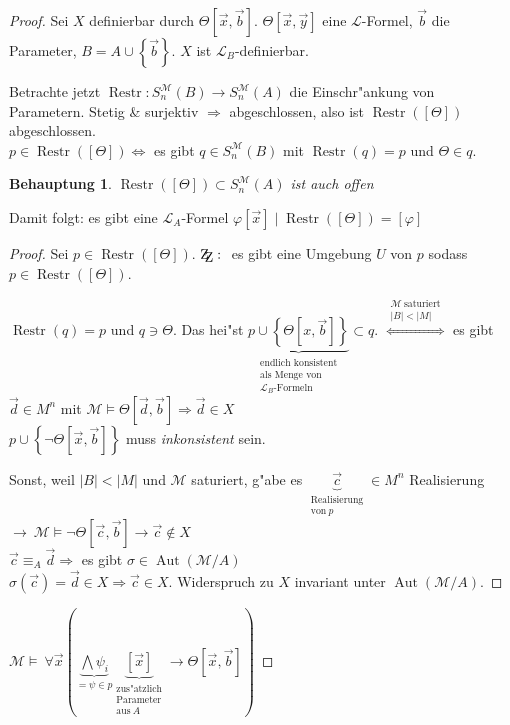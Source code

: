 \documentclass[a4paper,12pt,numbers=noenddot,parskip=full]{scrartcl}
\newcommand{\Forall}{~\forall}
\newcommand{\scrL}{\mathcal{L}}
\newcommand{\scrM}{\mathcal{M}}
\newcommand{\zz}{\mathrm{Z\kern-.3em\raise-0.5ex\hbox{Z}}:~}
\DeclareMathOperator{\au}{Aut}
\DeclareMathOperator{\rest}{Restr}
\theoremstyle{dotless}
\newtheorem*{claim}{Behauptung}
\begin{document}
\begin{proof}
	Sei $X$ definierbar durch $\Theta\left[\vec{x},\vec{b}\right]$. $\Theta\left[\vec{x},\vec{y}\right]$ eine $\scrL$-Formel, $\vec{b}$ die Parameter, $B=A \cup \left\{\vec{b} \right\}$. $X$ ist $\scrL_B$-definierbar.
	
	Betrachte jetzt $\rest: S_n^\scrM(B) \longrightarrow S_n^\scrM(A)$ die Einschr"ankung von Parametern. Stetig \& surjektiv $\Rightarrow$ abgeschlossen, also ist $\rest([\Theta])$ abgeschlossen.\\
	$p \in \rest([\Theta]) \Leftrightarrow$ es gibt $q \in S_n^\scrM(B)$ mit $\rest(q)=p$ und $\Theta \in q$.
	\begin{claim}
		$\rest([\Theta]) \subset S_n^\scrM(A)$ ist auch offen
	\end{claim}
	Damit folgt: es gibt eine $\scrL_A$-Formel $\varphi\left[\vec{x}\right] \mid \rest\left(\left[\Theta\right]\right) = \left[\varphi\right]$
	\begin{proof}
		Sei $p \in \rest\left(\left[\Theta\right]\right)$. $\zz$ es gibt eine Umgebung $U$ von $p$ sodass $p \in \rest \left(\left[\Theta\right]\right)$.
		
		$\rest(q) = p$ und $q \ni \Theta$. Das hei"st $\underbrace{p \cup \left\{\Theta\left[x, \vec{b}\right] \right\}}_{\substack{\text{endlich konsistent}\\\text{als Menge von}\\\scrL_B\text{-Formeln}}} \subset q$. $\overset{\substack{\scrM~\text{saturiert}\\|B| < |M|}}{\Longleftrightarrow}$ es gibt $\vec{d} \in M^n$ mit $\scrM \models \Theta\left[\vec{d},\vec{b}\right] \Rightarrow \vec{d} \in X$\\
		$p \cup \left\{\lnot \Theta \left[\vec{x},\vec{b}\right] \right\}$ muss \emph{inkonsistent} sein. 
		
		Sonst, weil $|B|< |M|$ und $\scrM$ saturiert, g"abe es $\underbrace{\vec{c}}_{\substack{\text{Realisierung}\\\text{von}~p}} \in M^n$ Realisierung $\rightarrow~ \scrM \models \lnot \Theta \left[\vec{c}, \vec{b}\right] \rightarrow \vec{c} \not\in X$\\
		$\vec{c} \equiv_A \vec{d} \Rightarrow$ es gibt $\sigma \in \au (\scrM/A)$\\
		$\sigma(\vec{c}) = \vec{d} \in X \Rightarrow \vec{c} \in X$. Widerspruch zu $X$ invariant unter $\au(\scrM/A)$.
	\end{proof}
	$\scrM \models \Forall\vec{x}(\underbrace{\bigwedge \psi_i}_{= \psi \in p} \underbrace{\left[\vec{x}\right]}_{\substack{\text{zus"atzlich}\\\text{Parameter}\\\text{aus}~A}} \rightarrow \Theta\left[\vec{x},\vec{b}\right])$
	

\end{proof}
\end{document}

